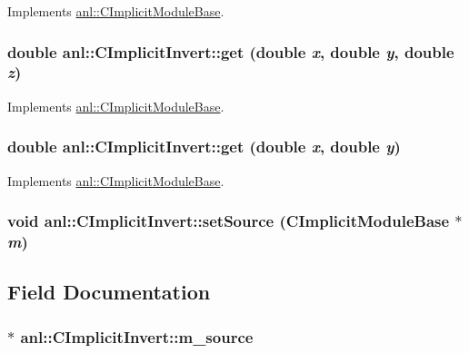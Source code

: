 Implements \hyperlink{classanl_1_1CImplicitModuleBase_a3cf520bdab59631864253c03b4e1723f}{anl::CImplicitModuleBase}.\hypertarget{classanl_1_1CImplicitInvert_ad6f8f7bbf36c6b7ef4fa024c316fd068}{
\subsubsection[{get}]{\setlength{\rightskip}{0pt plus 5cm}double anl::CImplicitInvert::get (double {\em x}, \/  double {\em y}, \/  double {\em z})}}
\label{classanl_1_1CImplicitInvert_ad6f8f7bbf36c6b7ef4fa024c316fd068}


Implements \hyperlink{classanl_1_1CImplicitModuleBase_ac17d592612c82ba3d47f9229a00b1fe3}{anl::CImplicitModuleBase}.\hypertarget{classanl_1_1CImplicitInvert_aa4dacdebefdd1721cdda423c41ec98b4}{
\subsubsection[{get}]{\setlength{\rightskip}{0pt plus 5cm}double anl::CImplicitInvert::get (double {\em x}, \/  double {\em y})}}
\label{classanl_1_1CImplicitInvert_aa4dacdebefdd1721cdda423c41ec98b4}


Implements \hyperlink{classanl_1_1CImplicitModuleBase_ab88f8a1822dcfbc13ba5230318b0acd1}{anl::CImplicitModuleBase}.\hypertarget{classanl_1_1CImplicitInvert_a631d00e3b2579172c0e819e3413b9d7c}{
\subsubsection[{setSource}]{\setlength{\rightskip}{0pt plus 5cm}void anl::CImplicitInvert::setSource ({\bf CImplicitModuleBase} $\ast$ {\em m})}}
\label{classanl_1_1CImplicitInvert_a631d00e3b2579172c0e819e3413b9d7c}


\subsection{Field Documentation}
\hypertarget{classanl_1_1CImplicitInvert_af613477aad7fdc6ac95376f511c3890f}{
\subsubsection[{m\_\-source}]{$\ast$ {\bf anl::CImplicitInvert::m\_\-source}}}
\label{classanl_1_1CImplicitInvert_af613477aad7fdc6ac95376f511c3890f}


